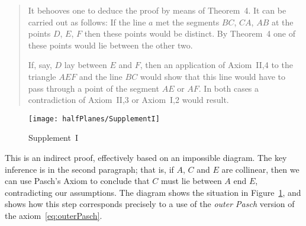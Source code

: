 \begin{quotation}
It behooves one to deduce the proof by means of Theorem~4. It can be carried out as follows: If the line $a$ met the segments $BC$, $CA$, $AB$ at the points $D$, $E$, $F$ then these points would be distinct. By Theorem~4 one of these points would lie between the other two.

If, say, $D$ lay between $E$ and $F$, then an application of Axiom~II,4 to the triangle $AEF$ and the line $BC$ would show that this line would have to pass through a point of the segment $AE$ or $AF$. In both cases a contradiction of Axiom~II,3 or Axiom~I,2 would result.
\end{quotation}

\begin{figure}
  \centering\texttt{[image: halfPlanes/SupplementI]}
  \caption{Supplement~I}
  \label{fig:SupplementI}
\end{figure}

This is an indirect proof, effectively based on an impossible diagram. The key inference is in the second paragraph; that is, if $A$, $C$ and $E$ are collinear, then we can use Pasch's Axiom to conclude that $C$ must lie between $A$ end $E$, contradicting our assumptions. The diagram shows the situation in Figure~\ref{fig:SupplementI}, and shows how this step corresponds precisely to a use of the \emph{outer Pasch} version of the axiom~\eqref{eq:outerPasch}.

